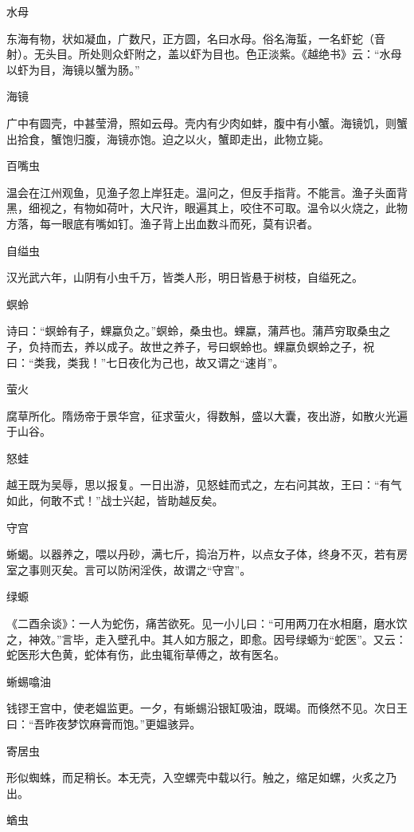 \documentclass[a4paper,12pt,UTF8,twoside]{ctexbook}
\begin{document}
    水母
    
    东海有物，状如凝血，广数尺，正方圆，名曰水母。俗名海蜇，一名虾蛇（音射）。无头目。所处则众虾附之，盖以虾为目也。色正淡紫。《越绝书》云：“水母以虾为目，海镜以蟹为肠。”
    
    海镜
    
    广中有圆壳，中甚莹滑，照如云母。壳内有少肉如蚌，腹中有小蟹。海镜饥，则蟹出拾食，蟹饱归腹，海镜亦饱。迫之以火，蟹即走出，此物立毙。
    
    百嘴虫
    
    温会在江州观鱼，见渔子忽上岸狂走。温问之，但反手指背。不能言。渔子头面背黑，细视之，有物如荷叶，大尺许，眼遍其上，咬住不可取。温令以火烧之，此物方落，每一眼底有嘴如钉。渔子背上出血数斗而死，莫有识者。
    
    自缢虫
    
    汉光武六年，山阴有小虫千万，皆类人形，明日皆悬于树枝，自缢死之。
    
    螟蛉
    
    诗曰：“螟蛉有子，蜾蠃负之。”螟蛉，桑虫也。蜾蠃，蒲芦也。蒲芦穷取桑虫之子，负持而去，养以成子。故世之养子，号曰螟蛉也。蜾蠃负螟蛉之子，祝曰：“类我，类我！”七日夜化为己也，故又谓之“速肖”。
    
    萤火
    
    腐草所化。隋炀帝于景华宫，征求萤火，得数斛，盛以大囊，夜出游，如散火光遍于山谷。
    
    怒蛙
    
    越王既为吴辱，思以报复。一日出游，见怒蛙而式之，左右问其故，王曰：“有气如此，何敢不式！”战士兴起，皆助越反矣。
    
    守宫
    
    蜥蝎。以器养之，喂以丹砂，满七斤，捣治万杵，以点女子体，终身不灭，若有房室之事则灭矣。言可以防闲淫佚，故谓之“守宫”。
    
    绿螈
    
    《二酉余谈》：一人为蛇伤，痛苦欲死。见一小儿曰：“可用两刀在水相磨，磨水饮之，神效。”言毕，走入壁孔中。其人如方服之，即愈。因号绿螈为“蛇医”。又云：蛇医形大色黄，蛇体有伤，此虫辄衔草傅之，故有医名。
    
    蜥蜴噏油
    
    钱镠王宫中，使老媪监更。一夕，有蜥蜴沿银缸吸油，既竭。而倏然不见。次日王曰：“吾昨夜梦饮麻膏而饱。”更媪骇异。
    
    寄居虫
    
    形似蜘蛛，而足稍长。本无壳，入空螺壳中载以行。触之，缩足如螺，火炙之乃出。
    
    蝤虫
    
\end{document}
